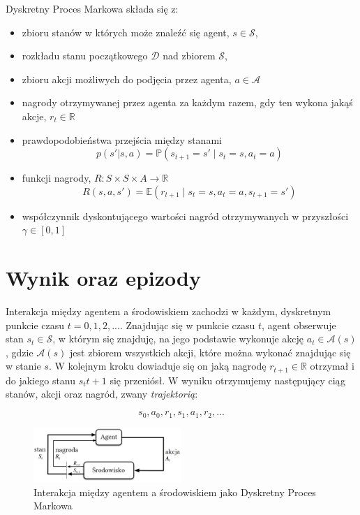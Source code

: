 \documentclass[licencjacka]{pracamgr}
\begin{document}
Dyskretny Proces Markowa składa się z:
\begin{itemize}
\item zbioru stanów w których może znaleźć się agent, $ s \in \mathcal{S} $,
\item rozkładu stanu początkowego $\mathcal{D}$ nad zbiorem $\mathcal{S}$,
\item zbioru akcji możliwych do podjęcia przez agenta, $ a \in \mathcal{A} $
\item nagrody otrzymywanej przez agenta za każdym razem, gdy ten wykona jakąś akcje, $ r_t \in \mathbb{R} $
\item prawdopodobieństwa przejścia między stanami
$$ p(s'|s, a) = \mathbb{P}(s_{t+1} = s' \mid s_t = s, a_t = a)$$
\item funkcji nagrody, $ R : S \times S \times A \rightarrow \mathbb{R} $
$$ R(s, a, s') = \mathbb{E}(r_{t+1} \mid s_t = s, a_t = a, s_{t+1} = s') $$
\item współczynnik dyskontującego wartości nagród otrzymywanych w przyszłości $ \gamma \in [0, 1] $
\end{itemize}


\section{Wynik oraz epizody}

Interakcja między agentem a środowiskiem zachodzi w każdym, dyskretnym punkcie czasu $ t = 0, 1, 2, ... $. Znajdując się w punkcie czasu $t$, agent obserwuje stan $ s_t \in \mathcal{S} $, w którym się znajduję, na jego podstawie wykonuje akcję $ a_t \in \mathcal{A}(s) $, gdzie $ \mathcal{A}(s) $ jest zbiorem wszystkich akcji, które można wykonać znajdując się w stanie $s$. W kolejnym kroku dowiaduje się on jaką nagrodę $ r_{t+1} \in \mathbb{R} $ otrzymał i do jakiego stanu $ s_t{t+1} $ się przeniósł. W wyniku otrzymujemy następujący ciąg stanów, akcji oraz nagród, zwany \emph{trajektorią}:

$$ s_0, a_0, r_1, s_1, a_1, r_2, ... $$


\begin{figure}[ht]
  \centering
  \includegraphics[width=0.5\textwidth]{agent_env_interaction}
  \caption{Interakcja między agentem a środowiskiem jako Dyskretny Proces Markowa}
\end{figure}
\end{document}
